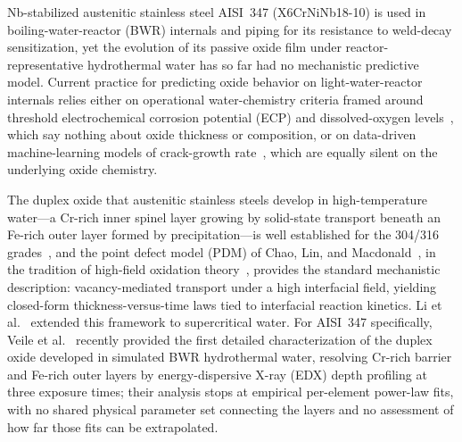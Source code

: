 \documentclass[preprint,12pt]{elsarticle}
\begin{document}
Nb-stabilized austenitic stainless steel AISI~347 (X6CrNiNb18-10) is
used in boiling-water-reactor (BWR) internals and piping for its
resistance to weld-decay sensitization, yet the evolution of its passive
oxide film under reactor-representative hydrothermal water has so far
had no mechanistic predictive model. Current practice for predicting
oxide behavior on light-water-reactor internals relies either on
operational water-chemistry criteria framed around threshold
electrochemical corrosion potential (ECP) and dissolved-oxygen
levels~\citep{macdonald1992hwc,lin1996ecp,yeh1995damage1,yeh1996damage2},
which say nothing about oxide thickness or composition, or on
data-driven machine-learning models of crack-growth
rate~\citep{igscc_ml_uq2025}, which are equally silent on the underlying
oxide chemistry.

The duplex oxide that austenitic stainless steels develop in
high-temperature water---a Cr-rich inner spinel layer growing by
solid-state transport beneath an Fe-rich outer layer formed by
precipitation---is well established for the 304/316
grades~\citep{robertson1991mechanism,stellwag1998mechanism,ziemniak2002corrosion,kuang2010oxidation,terachi2008corrosion,kim1999oxide,lister1987release},
and the point defect model (PDM) of Chao, Lin, and
Macdonald~\citep{chao1981pdm1,lin1981pdm2,macdonald1992pdm,macdonald2011history},
in the tradition of high-field oxidation
theory~\citep{cabrera1949oxidation}, provides the standard mechanistic
description: vacancy-mediated transport under a high interfacial field,
yielding closed-form thickness-versus-time laws tied to interfacial
reaction kinetics. Li et al.~\citep{li2020scwpdm} extended this
framework to supercritical water. For AISI~347 specifically, Veile et
al.~\citep{veile2024} recently provided the first detailed
characterization of the duplex oxide developed in simulated BWR
hydrothermal water, resolving Cr-rich barrier and Fe-rich outer layers
by energy-dispersive X-ray (EDX) depth profiling at three exposure
times; their analysis stops at empirical per-element power-law fits,
with no shared physical parameter set connecting the layers and no
assessment of how far those fits can be extrapolated.
\end{document}
